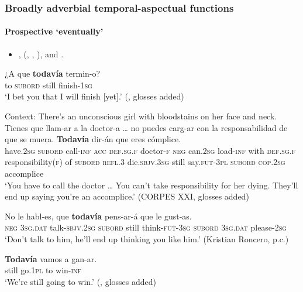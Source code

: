 \subsubsection{Broadly adverbial temporal-aspectual functions}
\paragraph{Prospective \lq eventually\rq{}}\label{appendixSpanishTodaviaEventually}
\begin{itemize}
	\item \textcite{Bosque2016}, \citeauthor{Garrido1991} (\citeyear{Garrido1991}, \citeyear{Garrido1992}, \citeyear{Garrido1993}), \textcite{UrdialesCampos1973} and \textcite{Martinez1996}.
\end{itemize}

\begin{exe}
	\ex\label{appendixSpanishTodaviaEventually1}
	\gll ¿A que \textbf{todavía} termin-o?\\
	\phantom{¿}to \textsc{subord} still finish-1\textsc{sg}\\
	\glt \lq I bet you that I will finish [yet].\rq{ }(\cite[382 fn 30]{Garrido1992}, glosses added)
			
	\ex Context: There's an unconscious girl with bloodstains on her face and neck.\label{appendixSpanishTodaviaEventually2}\\
	\gll Tienes que llam-ar a la doctor-a …	 no puedes carg-ar con la responsabilidad de que se muera. \textbf{Todavía} dir-án que eres cómplice.\\
	have.2\textsc{sg} \textsc{subord} call-\textsc{inf} \textsc{acc} \textsc{def}.\textsc{sg}.\textsc{f} doctor-\textsc{f} {}
	\textsc{neg} can.2\textsc{sg} load-\textsc{inf} with \textsc{def}.\textsc{sg}.\textsc{f} responsibility(\textsc{f}) of \textsc{subord} \textsc{refl}.3 die.\textsc{sbjv}.3\textsc{sg} still say.\textsc{fut}-3\textsc{pl} \textsc{subord} \textsc{cop}.2\textsc{sg} accomplice\\
	\glt \lq You have to call the doctor … You can't take responsibility for her dying. They'll end up saying you're an accomplice.\rq{ }(CORPES XXI, glosses added)
	
		\ex\label{appendixSpanishTodaviaEventually3}
	\gll No le habl-es, que \textbf{todavía} pens-ar-á que le gust-as.\\
	\textsc{neg} 3\textsc{sg}.\textsc{dat} talk-\textsc{sbjv}.2\textsc{sg} \textsc{subord} still think-\textsc{fut}-3\textsc{sg} \textsc{subord} 3\textsc{sg}.\textsc{dat} please-2\textsc{sg}\\
	\glt \lq Don't talk to him, he'll end up thinking you like him.\rq{ }(Kristian Roncero, p.c.)

	\ex\label{appendixSpanishTodaviaEventually4}
	\gll \textbf{Todavía} vamos a gan-ar.\\
	still go.1\textsc{pl} to win-\textsc{inf}\\
	\glt \lq We're still going to win.\rq{ }(\cite[370 fn18]{Garrido1992}, glosses added)
\end{exe}

